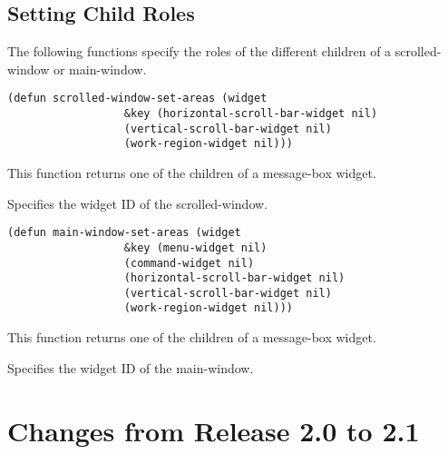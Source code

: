 \section{Setting Child Roles}

The following functions specify the roles of the different children of a
scrolled-window or main-window.

\begin{lispd}
\syntax\begin{verbatim}
(defun scrolled-window-set-areas (widget
				  &key (horizontal-scroll-bar-widget nil)
				  (vertical-scroll-bar-widget nil)
				  (work-region-widget nil)))
\end{verbatim}
\beschr This function returns one of the children of a message-box widget.
\parameter
\begin{paramd}
  Specifies the widget ID of the scrolled-window.
\end{paramd}
\end{lispd}

\begin{lispd}
\syntax\begin{verbatim}
(defun main-window-set-areas (widget
			      &key (menu-widget nil)
			      (command-widget nil)
			      (horizontal-scroll-bar-widget nil)
			      (vertical-scroll-bar-widget nil)
			      (work-region-widget nil)))
\end{verbatim}
\beschr This function returns one of the children of a message-box widget.
\parameter
\begin{paramd}
  Specifies the widget ID of the main-window.
\end{paramd}
\end{lispd}

\appendix

\chapter{Changes from Release 2.0 to 2.1}

